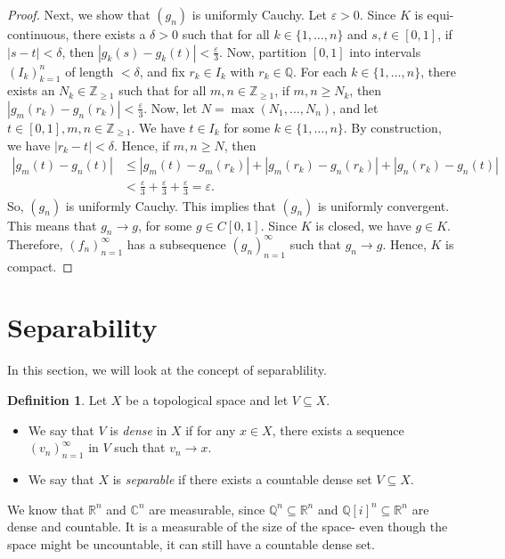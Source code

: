 \documentclass[a4paper, openany]{memoir}
\theoremstyle{definition}
\newtheorem{definition}{Definition}[section]
\theoremstyle{plain}
\begin{document}
\begin{proof}
        Next, we show that $(g_n)$ is uniformly Cauchy. Let $\varepsilon > 0$. Since $K$ is equi-continuous, there exists a $\delta > 0$ such that for all $k \in \{1, \dots, n\}$ and $s, t \in [0, 1]$, if $|s - t| < \delta$, then $|g_k(s) - g_k(t)| < \frac{\varepsilon}{3}$. Now, partition $[0, 1]$ into intervals $(I_k)_{k=1}^n$ of length $< \delta$, and fix $r_k \in I_k$ with $r_k \in \mathbb{Q}$. For each $k \in \{1, \dots, n\}$, there exists an $N_k \in \mathbb{Z}_{\geq 1}$ such that for all $m, n \in \mathbb{Z}_{\geq 1}$, if $m, n \geq N_k$, then $|g_m(r_k) - g_n(r_k)| < \frac{\varepsilon}{3}$. Now, let $N = \max(N_1, \dots, N_n)$, and let $t \in [0, 1], m, n \in \mathbb{Z}_{\geq 1}$. We have $t \in I_k$ for some $k \in \{1, \dots, n\}$. By construction, we have $|r_k - t| < \delta$. Hence, if $m, n \geq N$, then
        \begin{align*}
            |g_m(t) - g_n(t)| &\leq |g_m(t) - g_m(r_k)| + |g_m(r_k) - g_n(r_k)| + |g_n(r_k) - g_n(t)| \\
            &< \frac{\varepsilon}{3} + \frac{\varepsilon}{3} + \frac{\varepsilon}{3} = \varepsilon.
        \end{align*}
        So, $(g_n)$ is uniformly Cauchy. This implies that $(g_n)$ is uniformly convergent. This means that $g_n \to g$, for some $g \in C[0, 1]$. Since $K$ is closed, we have $g \in K$. Therefore, $(f_n)_{n=1}^\infty$ has a subsequence $(g_n)_{n=1}^\infty$ such that $g_n \to g$. Hence, $K$ is compact.
    \end{proof}
    \newpage
    
    \section{Separability}
    In this section, we will look at the concept of separablility.
    \begin{definition}
        Let $X$ be a topological space and let $V \subseteq X$.
        \begin{itemize}
            \item We say that $V$ is \emph{dense} in $X$ if for any $x \in X$, there exists a sequence $(v_n)_{n=1}^\infty$ in $V$ such that $v_n \to x$.
            \item We say that $X$ is \emph{separable} if there exists a countable dense set $V \subseteq X$.
        \end{itemize}
    \end{definition}
    \noindent We know that $\mathbb{R}^n$ and $\mathbb{C}^n$ are measurable, since $\mathbb{Q}^n \subseteq \mathbb{R}^n$ and $\mathbb{Q}[i]^n \subseteq \mathbb{R}^n$ are dense and countable. It is a measurable of the size of the space- even though the space might be uncountable, it can still have a countable dense set.
\end{document}
